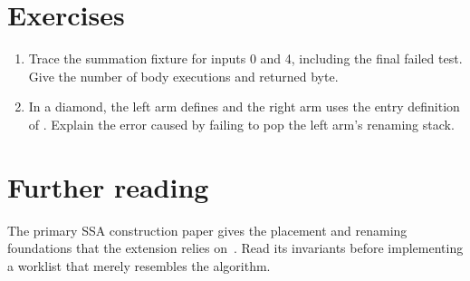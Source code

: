 \section{Exercises}
\label{sec:pebble-ten-exercises}
\begin{enumerate}
\item \label{ex:pebble-sum-trace} Trace the summation fixture for inputs 0 and 4, including the final failed test. Give the number of body executions and returned byte.
\item \label{ex:pebble-sibling-stack} In a diamond, the left arm defines  and the right arm uses the entry definition of . Explain the error caused by failing to pop the left arm's renaming stack.
\end{enumerate}

\section{Further reading}
\label{sec:pebble-ten-reading}
The primary SSA construction paper gives the placement and renaming foundations that the extension relies on~\cite{cytron-1991-ssa}.
Read its invariants before implementing a worklist that merely resembles the algorithm.
